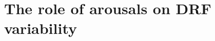 \cleardoublepage

\chapter{The role of arousals on DRF variability}
\label{res:arousal}

\cleardoublepage


